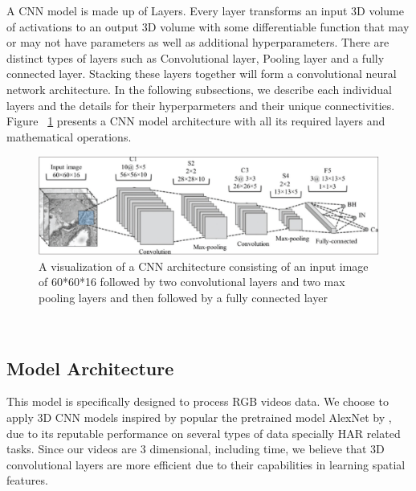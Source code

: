 A CNN model is made up of Layers. Every layer transforms an input 3D volume of activations to an output 3D volume with some differentiable function that may or may not have parameters as well as additional hyperparameters. There are distinct types of layers such as Convolutional layer, Pooling layer and a fully connected layer. Stacking these layers together will form a convolutional neural network architecture. In the following subsections, we describe each individual layers and the details for their hyperparmeters and their unique connectivities. Figure ~\ref{fig:standardCNN} presents a CNN model architecture with all its required layers and mathematical operations.
\begin{figure}[th]
\centering
\includegraphics{Figures/cnn}
\decoRule
\caption[A visualization of a CNN architecture consisting of an input image of 60*60*16 followed by two convolutional layers and two max pooling layers and then followed by a fully connected layer \parencite{haj2017classifications}]{A visualization of a CNN architecture consisting of an input image of 60*60*16 followed by two convolutional layers and two max pooling layers and then followed by a fully connected layer \parencite{haj2017classifications}}
\label{fig:standardCNN}
\end{figure}\\

\subsection{Model Architecture}
This model is specifically designed to process RGB videos data. We choose to apply 3D CNN models inspired by popular the pretrained model AlexNet by \cite{krizhevsky2012imagenet}, due to its reputable performance on several types of data specially HAR related tasks. Since our videos are 3 dimensional, including time, we believe that 3D convolutional layers are more efficient due to their capabilities in learning spatial features.\\


